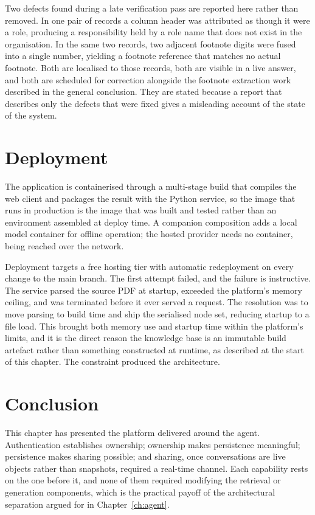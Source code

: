 Two defects found during a late verification pass are reported here rather than removed. In
one pair of records a column header was attributed as though it were a role, producing a
responsibility held by a role name that does not exist in the organisation. In the same two
records, two adjacent footnote digits were fused into a single number, yielding a footnote
reference that matches no actual footnote. Both are localised to those records, both are
visible in a live answer, and both are scheduled for correction alongside the footnote
extraction work described in the general conclusion. They are stated because a report that
describes only the defects that were fixed gives a misleading account of the state of the
system.

\section{Deployment}
\label{sec:deployment}

The application is containerised\citep{docker_docs} through a multi-stage build that
compiles the web client and packages the result with the Python service, so the image that
runs in production is the image that was built and tested rather than an environment
assembled at deploy time. A companion composition adds a local model container for offline
operation; the hosted provider needs no container, being reached over the network.

Deployment targets a free hosting tier\citep{render_docs} with automatic redeployment on
every change to the main branch. The first attempt failed, and the failure is instructive.
The service parsed the source PDF at startup, exceeded the platform's memory ceiling, and
was terminated before it ever served a request. The resolution was to move parsing to
build time and ship the serialised node set, reducing startup to a file load. This brought
both memory use and startup time within the platform's limits, and it is the direct reason
the knowledge base is an immutable build artefact rather than something constructed at
runtime, as described at the start of this chapter. The constraint produced the
architecture.

\section*{Conclusion}

This chapter has presented the platform delivered around the agent. Authentication
establishes ownership; ownership makes persistence meaningful; persistence makes sharing
possible; and sharing, once conversations are live objects rather than snapshots,
required a real-time channel. Each capability rests on the one before it, and none of them
required modifying the retrieval or generation components, which is the practical payoff
of the architectural separation argued for in Chapter~\ref{ch:agent}.

